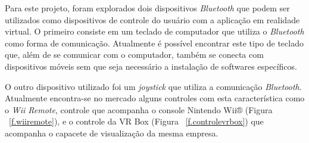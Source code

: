 Para este projeto, foram explorados dois dispositivos \textit{Bluetooth} que podem ser utilizados como dispositivos de controle do usuário com a aplicação em realidade virtual. O primeiro consiste em um teclado de computador que utiliza o \textit{Bluetooth} como forma de comunicação. Atualmente é possível encontrar este tipo de teclado que, além de se comunicar com o computador, também se conecta com dispositivos móveis sem que seja necessário a instalação de softwares específicos. 

O outro dispositivo utilizado foi um \textit{joystick} que utiliza a comunicação \textit{Bluetooth}. Atualmente encontra-se no mercado alguns controles com esta característica como o \textit{Wii Remote}, controle que acompanha o console Nintendo Wii® (Figura ~\ref{f.wiiremote}), e o controle da VR Box (Figura ~\ref{f.controlevrbox}) que acompanha o capacete de visualização da mesma empresa.

